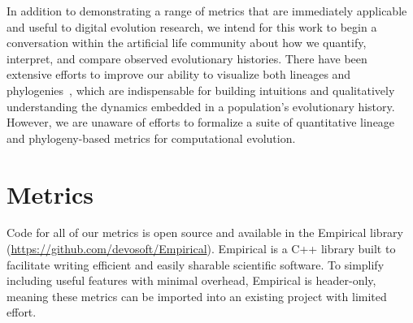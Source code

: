 \documentclass[letterpaper]{article}
\begin{document}
In addition to demonstrating a range of metrics that are immediately applicable and useful to digital evolution research, we intend for this work to begin a conversation within the %
artificial life
community about how we quantify, interpret, and compare observed evolutionary histories. There have been extensive efforts to improve our ability to visualize both lineages and phylogenies~\citep{standish_visualising_2002,burlacu_visualization_2013, mcphee_using_2016,mcphee_visualizing_2016, lalejini_evolutionary_2016}, which are %
indispensable 
for building intuitions and qualitatively understanding the dynamics embedded in a population's evolutionary history. However, we are unaware of efforts to formalize a suite of quantitative lineage and phylogeny-based metrics for computational evolution. %

\section{Metrics}

Code for all of our metrics is open source and available in the Empirical library (\url{https://github.com/devosoft/Empirical}). Empirical is a C++ library built to facilitate writing efficient and easily sharable scientific software. To simplify including useful features with minimal overhead, Empirical is header-only, meaning these metrics can be imported into an existing project with limited effort.
\end{document}
